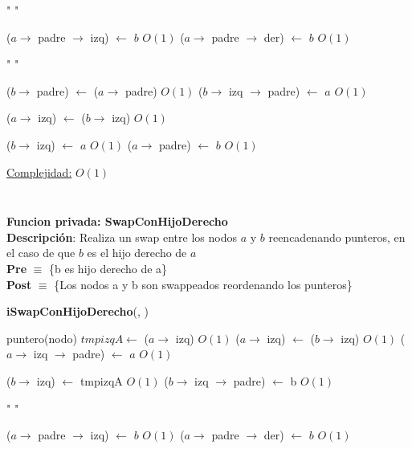 \begin{Algoritmos}
\begin{algorithm}[H]
\begin{algorithmic}[1]
    \State " "

        \State ($a \to$ padre $\to$ izq) $\gets$ $b$ \Comment $O(1)$
    \Else {}
        \State ($a \to$ padre $\to$ der) $\gets$ $b$ \Comment $O(1)$
    \EndIf
    \EndIf
    
    \State " "

    \State ($b \to$ padre) $\gets$ ($a \to$ padre) \Comment $O(1)$
        \State ($b \to$ izq $\to$ padre) $\gets$ $a$ \Comment $O(1)$
    \EndIf
    
    \State ($a \to$ izq) $\gets$ ($b \to$ izq) \Comment $O(1)$
    
    \State ($b \to$ izq) $\gets$ $a$ \Comment $O(1)$
    \State ($a \to$ padre) $\gets$ $b$ \Comment $O(1)$


    \medskip
    \Statex \underline{Complejidad:} $O(1)$

\end{algorithmic}
\end{algorithm}

$ $\newline


$ $\newline

\textbf{Funcion privada: SwapConHijoDerecho}\\
\textbf{Descripci\'on}: Realiza un swap entre los nodos $a$ y $b$ reencadenando punteros, en el caso de que $b$ es el hijo derecho de $a$\\ 
\textbf{Pre} $\equiv$ \{b es hijo derecho de a\}\\%
\textbf{Post} $\equiv$ \{Los nodos a y b son swappeados reordenando los punteros\}%
\begin{algorithm}[H]
{\textbf{iSwapConHijoDerecho}(, )}
\begin{algorithmic}[1]

    \State puntero(nodo) $tmpizqA \gets$ ($a \to$ izq) \Comment $O(1)$
    \State ($a \to$ izq) $\gets$ ($b \to$ izq)  \Comment $O(1)$
        \State ($a \to$ izq $\to$ padre) $\gets$ $a$ \Comment $O(1)$
    \EndIf

    \State ($b \to$ izq) $\gets$ tmpizqA  \Comment $O(1)$
        \State ($b \to$ izq $\to$ padre) $\gets$ b  \Comment $O(1)$
    \EndIf
    
    \State " "

        \State ($a \to$ padre $\to$ izq) $\gets$ $b$ \Comment $O(1)$
    \Else {}
        \State ($a \to$ padre $\to$ der) $\gets$ $b$ \Comment $O(1)$
    \EndIf
    \EndIf
    

\end{algorithmic}
\end{algorithm}
\end{Algoritmos}
